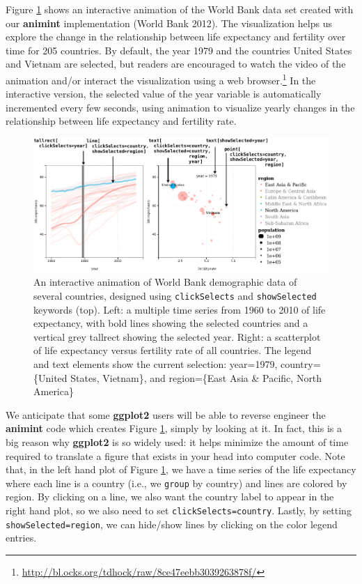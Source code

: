 \documentclass[12pt,]{article}
\let\rmarkdownfootnote\footnote%
\def\footnote{\protect\rmarkdownfootnote}
\theoremstyle{definition}
\theoremstyle{definition}
\theoremstyle{definition}
\theoremstyle{remark}
\begin{document}
Figure \ref{fig:worldbank} shows an interactive animation of the World
Bank data set created with our \textbf{animint} implementation (World
Bank 2012). The visualization helps us explore the change in the
relationship between life expectancy and fertility over time for 205
countries. By default, the year 1979 and the countries United States and
Vietnam are selected, but readers are encouraged to watch the video of
the animation and/or interact the visualization using a web
browser.\footnote{\url{http://bl.ocks.org/tdhock/raw/8ce47eebb3039263878f/}}
In the interactive version, the selected value of the year variable is
automatically incremented every few seconds, using animation to
visualize yearly changes in the relationship between life expectancy and
fertility rate.

\begin{figure}
\centering
\includegraphics{images/figure-1}
\caption{\label{fig:worldbank}An interactive animation of World Bank
demographic data of several countries, designed using
\texttt{clickSelects} and \texttt{showSelected} keywords (top). Left: a
multiple time series from 1960 to 2010 of life expectancy, with bold
lines showing the selected countries and a vertical grey tallrect
showing the selected year. Right: a scatterplot of life expectancy
versus fertility rate of all countries. The legend and text elements
show the current selection: year=1979, country=\{United States,
Vietnam\}, and region=\{East Asia \& Pacific, North America\}}
\end{figure}

We anticipate that some \textbf{ggplot2} users will be able to reverse
engineer the \textbf{animint} code which creates Figure
\ref{fig:worldbank}, simply by looking at it. In fact, this is a big
reason why \textbf{ggplot2} is so widely used: it helps minimize the
amount of time required to translate a figure that exists in your head
into computer code. Note that, in the left hand plot of Figure
\ref{fig:worldbank}, we have a time series of the life expectancy where
each line is a country (i.e., we \texttt{group} by country) and lines
are colored by region. By clicking on a line, we also want the country
label to appear in the right hand plot, so we also need to set
\texttt{clickSelects=country}. Lastly, by setting
\texttt{showSelected=region}, we can hide/show lines by clicking on the
color legend entries.
\end{document}
